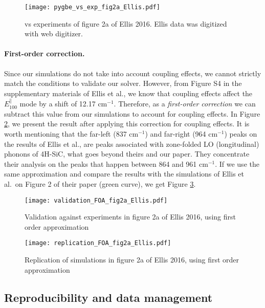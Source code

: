 \begin{figure}
    \centering
    \texttt{[image: pygbe\_vs\_exp\_fig2a\_Ellis.pdf]} 
    \caption{\pygbe vs experiments of figure 2a of Ellis 2016. Ellis data 
    was digitized with web digitizer.}
    \label{fig:pygbe_vs_exp_2a}
 \end{figure}

\paragraph{First-order correction.}

Since our simulations do not take into account coupling effects, we cannot strictly match 
the conditions to validate our solver. However, from Figure S4 in the supplementary 
materials of Ellis et al., we know that coupling effects affect the $E^{\parallel}_{100}$ 
mode by a shift of 12.17 cm$^{-1}$. Therefore, as a \textit{first-order correction} we can 
subtract this value from our simulations to account for coupling effects. In Figure 
\ref{fig:val_2a}, we present the result after applying this correction for coupling effects.
It is worth mentioning that the far-left (837 cm$^{-1}$) and far-right (964 cm$^{-1}$) peaks 
on the results of Ellis et al., are peaks associated with zone-folded LO (longitudinal) phonons of 4H-SiC,
what goes beyond theirs \cite{ellis2016} and our paper. They concentrate their analysis on the peaks that happen between 864 and 961 cm$^{-1}$.
If we use the same approximation and compare the results with the simulations of Ellis et al.\ on
Figure 2 of their paper (green curve), we get Figure \ref{fig:rep_2a}.

\begin{figure}
    \centering
    \texttt{[image: validation\_FOA\_fig2a\_Ellis.pdf]} 
    \caption{Validation against experiments in figure 2a of Ellis 2016, using first order approximation}
    \label{fig:val_2a}
 \end{figure}

\begin{figure}
    \centering
    \texttt{[image: replication\_FOA\_fig2a\_Ellis.pdf]} 
    \caption{Replication of simulations in figure 2a of Ellis 2016, using first
     order approximation}
    \label{fig:rep_2a}
 \end{figure}
 
 
 \subsection{Reproducibility and data management} \label{sec:reprod}
 
